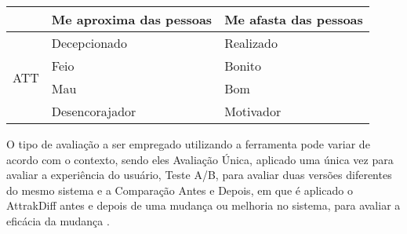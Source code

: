 \begin{table}[h]
\begin{tabular}{|c|ll|}
                         & \multicolumn{1}{l|}{Me aproxima das pessoas} & Me afasta das pessoas \\ \hline
    \multirow{4}{*}{ATT} & \multicolumn{1}{l|}{Decepcionado}            & Realizado             \\ \cline{2-3} 
                         & \multicolumn{1}{l|}{Feio}                    & Bonito                \\ \cline{2-3} 
                         & \multicolumn{1}{l|}{Mau}                     & Bom                   \\ \cline{2-3} 
                         & \multicolumn{1}{l|}{Desencorajador}          & Motivador             \\ \hline
    \end{tabular}
\end{table}

O tipo de avaliação a ser empregado utilizando a ferramenta pode variar de acordo com o contexto, sendo eles Avaliação Única, aplicado uma única vez para avaliar 
a experiência do usuário, Teste A/B, para avaliar duas versões diferentes do mesmo sistema e a Comparação Antes e Depois, em que é aplicado o AttrakDiff antes e 
depois de uma mudança ou melhoria no sistema, para avaliar a eficácia da mudança \cite{nzongo2018}.
